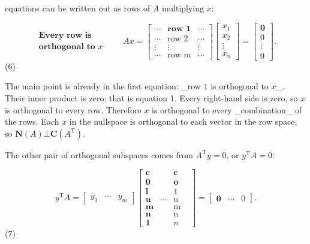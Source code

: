 equations can be written out as rows of \(A\) multiplying \(x\):

\[\begin{array}{l}\textbf{Every row is}\\ \textbf{orthogonal to }x\end{array}\qquad Ax=\begin{bmatrix}\cdots&\textbf{row 1}& \cdots\\ \cdots&\text{row 2}&\cdots\\ \vdots&\vdots&\vdots\\ \cdots&\text{row }m&\cdots\end{bmatrix}\begin{bmatrix}x_{1}\\ x_{2}\\ \vdots\\ x_{n}\end{bmatrix}=\begin{bmatrix}\textbf{0}\\ 0\\ \vdots\\ 0\end{bmatrix}.\] (6)

The main point is already in the first equation: _row \(1\) is orthogonal to \(x\)_. Their inner product is zero; that is equation 1. Every right-hand side is zero, so \(x\) is orthogonal to every row. Therefore \(x\) is orthogonal to every _combination_ of the rows. Each \(x\) in the nullspace is orthogonal to each vector in the row space, so \(\boldsymbol{N}(A)\bot\boldsymbol{C}(A^{\mathrm{T}})\).

The other pair of orthogonal subspaces comes from \(A^{\mathrm{T}}y=0\), or \(y^{\mathrm{T}}A=0\):

\[y^{\mathrm{T}}A=\begin{bmatrix}y_{1}&\cdots&y_{m}\end{bmatrix}\begin{bmatrix} \textbf{c}&&\textbf{c}\\ \textbf{0}&&\textbf{o}\\ \textbf{l}&&1&\\ \textbf{u}&\cdots&\text{u}\\ \textbf{m}&&\text{m}\\ \textbf{n}&&\text{n}\\ \textbf{1}&&n\end{bmatrix}=\begin{bmatrix}\textbf{0}&\cdots&0\end{bmatrix}.\] (7)

